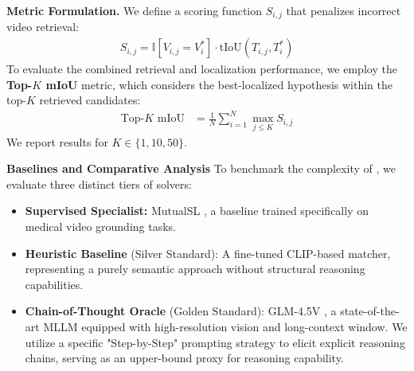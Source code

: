 \textbf{Metric Formulation.} We define a scoring function $S_{i,j}$ that penalizes incorrect video retrieval:
\begin{align}
    S_{i,j} = \mathbb{I}[V_{i,j} = V_i^*] \cdot \text{tIoU}(T_{i,j}, T_i^*)
\end{align}
To evaluate the combined retrieval and localization performance, we employ the \textbf{Top-$K$ mIoU} metric, which considers the best-localized hypothesis within the top-$K$ retrieved candidates:
\begin{align}
    \text{Top-}K\text{ mIoU} &= \frac{1}{N} \sum_{i=1}^{N} \max_{j \le K} S_{i,j}
\end{align}
We report results for $K \in \{1, 10, 50\}$.

\textbf{Baselines and Comparative Analysis}
To benchmark the complexity of \BenchmarkName, we evaluate three distinct tiers of solvers:
\begin{itemize}
    \item \textbf{Supervised Specialist:} MutualSL \cite{mutualsl}, a baseline trained specifically on medical video grounding tasks.
    \item \textbf{Heuristic Baseline} (Silver Standard): A fine-tuned CLIP-based matcher, representing a purely semantic approach without structural reasoning capabilities.
    \item \textbf{Chain-of-Thought Oracle} (Golden Standard): GLM-4.5V \cite{glm}, a state-of-the-art MLLM equipped with high-resolution vision and long-context window. We utilize a specific "Step-by-Step" prompting strategy to elicit explicit reasoning chains, serving as an upper-bound proxy for reasoning capability.
\end{itemize}

